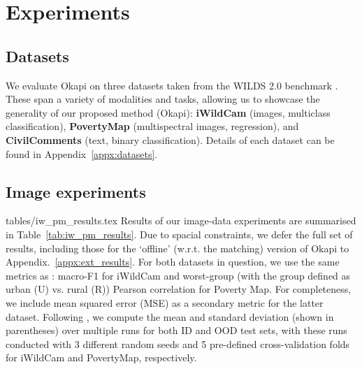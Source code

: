 \section{Experiments}\label{sec:exps}
%
\subsection{Datasets}\label{sec:exps_datasets} 
%
We evaluate Okapi on three datasets taken from the WILDS 2.0 benchmark \cite{SagWeiLeeGaoetal22}. 
%
These span a variety of modalities and tasks, allowing us to showcase the generality of our
proposed method (Okapi): \textbf{iWildCam} (images, multiclass classification), \textbf{PovertyMap}
(multispectral images, regression), and \textbf{CivilComments} (text, binary classification). 
%
Details of each dataset can be found in Appendix~\ref{appx:datasets}.
%
\subsection{Image experiments}
%
{tables/iw_pm_results.tex}
%
Results of our image-data experiments are summarised in Table~\ref{tab:iw_pm_results}. 
%
Due to spacial constraints, we defer the full set of results, including those for the `offline'
(w.r.t. the matching) version of Okapi to Appendix.~\ref{appx:ext_results}. 
%
For both datasets in question, we use the same metrics as \cite{SagWeiLeeGaoetal22}: macro-F1 for
iWildCam and worst-group (with the group defined as urban (U) vs. rural (R)) Pearson correlation
for Poverty Map. 
%
For completeness, we include mean squared error (MSE) as a secondary metric for the latter dataset.
%
Following \cite{SagWeiLeeGaoetal22}, we compute the mean and standard deviation (shown in
parentheses) over multiple runs for both ID and OOD test sets, with these runs conducted with 3
different random seeds and 5 pre-defined cross-validation folds for iWildCam and PovertyMap,
respectively.

